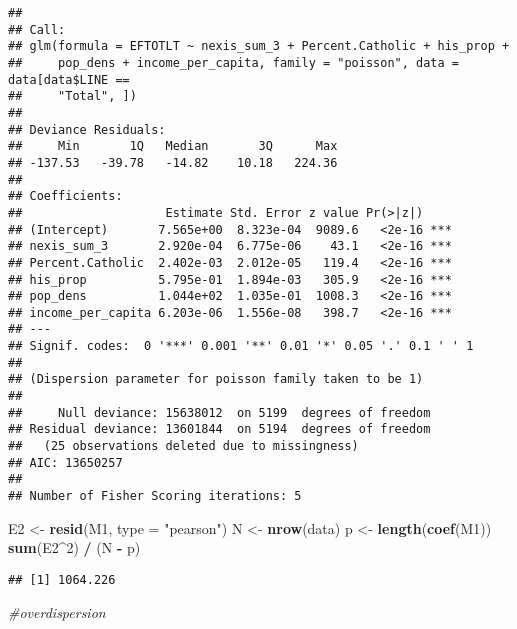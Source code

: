 \documentclass[]{article}
\newenvironment{Shaded}{\begin{snugshade}}{\end{snugshade}}
\newcommand{\KeywordTok}[1]{\textcolor[rgb]{0.13,0.29,0.53}{\textbf{#1}}}
\newcommand{\DataTypeTok}[1]{\textcolor[rgb]{0.13,0.29,0.53}{#1}}
\newcommand{\DecValTok}[1]{\textcolor[rgb]{0.00,0.00,0.81}{#1}}
\newcommand{\StringTok}[1]{\textcolor[rgb]{0.31,0.60,0.02}{#1}}
\newcommand{\CommentTok}[1]{\textcolor[rgb]{0.56,0.35,0.01}{\textit{#1}}}
\newcommand{\OperatorTok}[1]{\textcolor[rgb]{0.81,0.36,0.00}{\textbf{#1}}}
\newcommand{\NormalTok}[1]{#1}
\begin{document}
\begin{verbatim}
## 
## Call:
## glm(formula = EFTOTLT ~ nexis_sum_3 + Percent.Catholic + his_prop + 
##     pop_dens + income_per_capita, family = "poisson", data = data[data$LINE == 
##     "Total", ])
## 
## Deviance Residuals: 
##     Min       1Q   Median       3Q      Max  
## -137.53   -39.78   -14.82    10.18   224.36  
## 
## Coefficients:
##                    Estimate Std. Error z value Pr(>|z|)    
## (Intercept)       7.565e+00  8.323e-04  9089.6   <2e-16 ***
## nexis_sum_3       2.920e-04  6.775e-06    43.1   <2e-16 ***
## Percent.Catholic  2.402e-03  2.012e-05   119.4   <2e-16 ***
## his_prop          5.795e-01  1.894e-03   305.9   <2e-16 ***
## pop_dens          1.044e+02  1.035e-01  1008.3   <2e-16 ***
## income_per_capita 6.203e-06  1.556e-08   398.7   <2e-16 ***
## ---
## Signif. codes:  0 '***' 0.001 '**' 0.01 '*' 0.05 '.' 0.1 ' ' 1
## 
## (Dispersion parameter for poisson family taken to be 1)
## 
##     Null deviance: 15638012  on 5199  degrees of freedom
## Residual deviance: 13601844  on 5194  degrees of freedom
##   (25 observations deleted due to missingness)
## AIC: 13650257
## 
## Number of Fisher Scoring iterations: 5
\end{verbatim}

\begin{Shaded}
\begin{Highlighting}[]
\NormalTok{E2 <-}\StringTok{ }\KeywordTok{resid}\NormalTok{(M1, }\DataTypeTok{type =} \StringTok{"pearson"}\NormalTok{)}
\NormalTok{N  <-}\StringTok{ }\KeywordTok{nrow}\NormalTok{(data)}
\NormalTok{p  <-}\StringTok{ }\KeywordTok{length}\NormalTok{(}\KeywordTok{coef}\NormalTok{(M1))   }
\KeywordTok{sum}\NormalTok{(E2}\OperatorTok{^}\DecValTok{2}\NormalTok{) }\OperatorTok{/}\StringTok{ }\NormalTok{(N }\OperatorTok{-}\StringTok{ }\NormalTok{p)}
\end{Highlighting}
\end{Shaded}

\begin{verbatim}
## [1] 1064.226
\end{verbatim}

\begin{Shaded}
\begin{Highlighting}[]
\CommentTok{#overdispersion}
\end{Highlighting}
\end{Shaded}

\begin{Shaded}
\end{Shaded}
\end{document}
